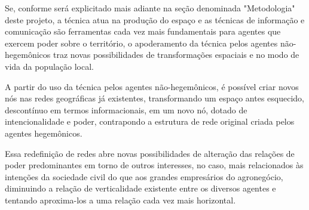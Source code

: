 Se, conforme será explicitado mais adiante na seção denominada "Metodologia" deste projeto, a técnica atua na produção do espaço e as técnicas de informação e comunicação são ferramentas cada vez mais fundamentais para agentes que exercem poder sobre o território, o apoderamento da técnica pelos agentes não-hegemônicos traz novas possibilidades de transformações espaciais e no modo de vida da população local.

A partir do uso da técnica pelos agentes não-hegemônicos, é possível criar novos nós nas redes geográficas já existentes, transformando um espaço antes esquecido, descontínuo em termos informacionais, em um novo nó, dotado de intencionalidade e poder, contrapondo a estrutura de rede original criada pelos agentes hegemônicos. 

Essa redefinição de redes abre novas possibilidades de alteração das relações de poder predominantes em torno de outros interesses, no caso, mais relacionados às intenções da sociedade civil do que aos grandes empresários do agronegócio, diminuindo a relação de verticalidade existente entre os diversos agentes e tentando aproxima-los a uma relação cada vez mais horizontal.
